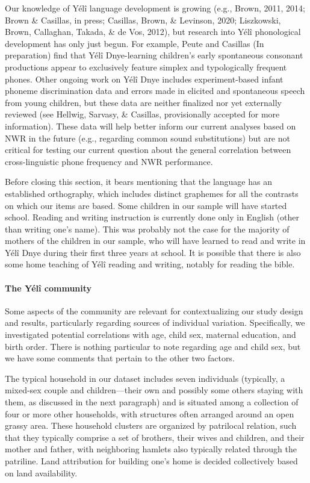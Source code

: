 \documentclass[
  american,
  ,man,floatsintext]{apa6}
\let\oldparagraph\paragraph
\renewcommand{\paragraph}[1]{\oldparagraph{#1}\mbox{}}
\begin{document}
Our knowledge of Yélî language development is growing (e.g., Brown, 2011, 2014; Brown \& Casillas, in press; Casillas, Brown, \& Levinson, 2020; Liszkowski, Brown, Callaghan, Takada, \& de Vos, 2012), but research into Yélî phonological development has only just begun. For example, Peute and Casillas (In preparation) find that Yélî Dnye-learning children's early spontaneous consonant productions appear to exclusively feature simplex and typologically frequent phones. Other ongoing work on Yélî Dnye includes experiment-based infant phoneme discrimination data and errors made in elicited and spontaneous speech from young children, but these data are neither finalized nor yet externally reviewed (see Hellwig, Sarvasy, \& Casillas, provisionally accepted for more information). These data will help better inform our current analyses based on NWR in the future (e.g., regarding common sound substitutions) but are not critical for testing our current question about the general correlation between cross-linguistic phone frequency and NWR performance.

Before closing this section, it bears mentioning that the language has an established orthography, which includes distinct graphemes for all the contrasts on which our items are based. Some children in our sample will have started school. Reading and writing instruction is currently done only in English (other than writing one's name). This was probably not the case for the majority of mothers of the children in our sample, who will have learned to read and write in Yélî Dnye during their first three years at school. It is possible that there is also some home teaching of Yélî reading and writing, notably for reading the bible.

\hypertarget{the-yuxe9luxee-community}{%
\paragraph{The Yélî community}\label{the-yuxe9luxee-community}}

Some aspects of the community are relevant for contextualizing our study design and results, particularly regarding sources of individual variation. Specifically, we investigated potential correlations with age, child sex, maternal education, and birth order. There is nothing particular to note regarding age and child sex, but we have some comments that pertain to the other two factors.

The typical household in our dataset includes seven individuals (typically, a mixed-sex couple and children---their own and possibly some others staying with them, as discussed in the next paragraph) and is situated among a collection of four or more other households, with structures often arranged around an open grassy area. These household clusters are organized by patrilocal relation, such that they typically comprise a set of brothers, their wives and children, and their mother and father, with neighboring hamlets also typically related through the patriline. Land attribution for building one's home is decided collectively based on land availability.
\end{document}
